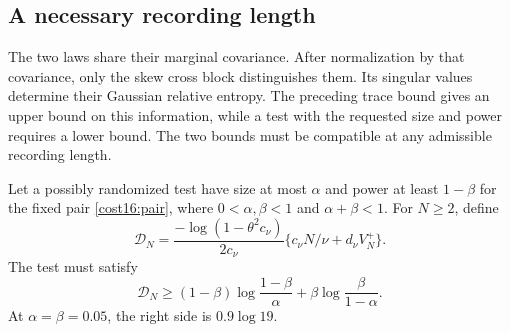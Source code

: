 \subsection{A necessary recording length}

The two laws share their marginal covariance. After normalization by that covariance, only the skew cross block distinguishes them. Its singular values determine their Gaussian relative entropy. The preceding trace bound gives an upper bound on this information, while a test with the requested size and power requires a lower bound. The two bounds must be compatible at any admissible recording length.

\begin{theorem}
\label{cost16:necessary}
Let a possibly randomized test have size at most $\alpha$ and power at least $1-\beta$ for the fixed pair \eqref{cost16:pair}, where $0<\alpha,\beta<1$ and $\alpha+\beta<1$. For $N\ge2$, define
\begin{equation}
 \mathcal D_N=\frac{-\log(1-\theta^2c_\nu)}{2c_\nu}
       \{c_\nu N/\nu+d_\nu V_N^+\}.
 \label{cost16:divergence-bound}
\end{equation}
The test must satisfy
\begin{equation}
 \mathcal D_N\ge (1-\beta)\log\frac{1-\beta}{\alpha}
                +\beta\log\frac{\beta}{1-\alpha}.
 \label{cost16:necessary-inequality}
\end{equation}
At $\alpha=\beta=0.05$, the right side is $0.9\log19$.
\end{theorem}
